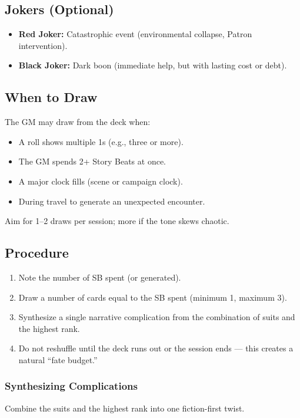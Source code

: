 \subsection{Jokers (Optional)}

\begin{itemize}
  \item \textbf{Red Joker:} Catastrophic event (environmental collapse, Patron intervention).
  \item \textbf{Black Joker:} Dark boon (immediate help, but with lasting cost or debt).
\end{itemize}

\subsection{When to Draw}

The GM may draw from the deck when:
\begin{itemize}
  \item A roll shows multiple 1s (e.g., three or more).
  \item The GM spends 2+ Story Beats at once.
  \item A major clock fills (scene or campaign clock).
  \item During travel to generate an unexpected encounter.
\end{itemize}

Aim for 1–2 draws per session; more if the tone skews chaotic.

\subsection{Procedure}

\begin{enumerate}
  \item Note the number of SB spent (or generated).
  \item Draw a number of cards equal to the SB spent (minimum 1, maximum 3).
  \item Synthesize a single narrative complication from the combination of suits and the highest rank.
  \item Do not reshuffle until the deck runs out or the session ends — this creates a natural ``fate budget.''
\end{enumerate}

\subsubsection{Synthesizing Complications}
Combine the suits and the highest rank into one fiction-first twist.

